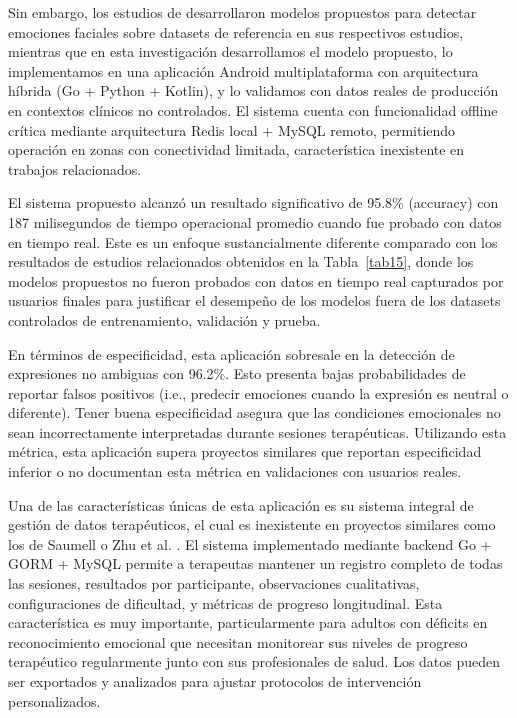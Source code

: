 \documentclass[journal,article,submit,pdftex,moreauthors]{Definitions/mdpi}
\begin{document}
	Sin embargo, los estudios de \cite{ref1,ref2,ref3,ref4,ref5,ref7,ref8,ref9} desarrollaron modelos propuestos para detectar emociones faciales sobre datasets de referencia en sus respectivos estudios, mientras que en esta investigación desarrollamos el modelo propuesto, lo implementamos en una aplicación Android multiplataforma con arquitectura híbrida (Go + Python + Kotlin), y lo validamos con datos reales de producción en contextos clínicos no controlados. El sistema cuenta con funcionalidad offline crítica mediante arquitectura Redis local + MySQL remoto, permitiendo operación en zonas con conectividad limitada, característica inexistente en trabajos relacionados.
	
	El sistema propuesto alcanzó un resultado significativo de 95.8\% (accuracy) con 187 milisegundos de tiempo operacional promedio cuando fue probado con datos en tiempo real. Este es un enfoque sustancialmente diferente comparado con los resultados de estudios relacionados obtenidos en la Tabla~\ref{tab15}, donde los modelos propuestos no fueron probados con datos en tiempo real capturados por usuarios finales para justificar el desempeño de los modelos fuera de los datasets controlados de entrenamiento, validación y prueba.
	
	En términos de especificidad, esta aplicación sobresale en la detección de expresiones no ambiguas con 96.2\%. Esto presenta bajas probabilidades de reportar falsos positivos (i.e., predecir emociones cuando la expresión es neutral o diferente). Tener buena especificidad asegura que las condiciones emocionales no sean incorrectamente interpretadas durante sesiones terapéuticas. Utilizando esta métrica, esta aplicación supera proyectos similares que reportan especificidad inferior o no documentan esta métrica en validaciones con usuarios reales.
	
	Una de las características únicas de esta aplicación es su sistema integral de gestión de datos terapéuticos, el cual es inexistente en proyectos similares como los de Saumell \cite{ref2} o Zhu et al. \cite{ref3}. El sistema implementado mediante backend Go + GORM + MySQL permite a terapeutas mantener un registro completo de todas las sesiones, resultados por participante, observaciones cualitativas, configuraciones de dificultad, y métricas de progreso longitudinal. Esta característica es muy importante, particularmente para adultos con déficits en reconocimiento emocional que necesitan monitorear sus niveles de progreso terapéutico regularmente junto con sus profesionales de salud. Los datos pueden ser exportados y analizados para ajustar protocolos de intervención personalizados.
	
\end{document}
